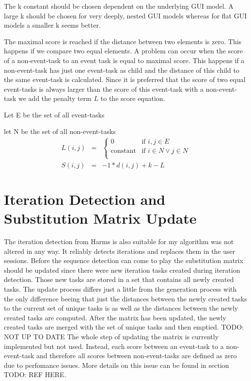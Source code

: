 The k constant should be chosen dependent on the underlying GUI model. A large k should be chosen for very deeply, nested GUI models whereas for flat GUI models a smaller k seems better. 

The maximal score is reached if the distance between two elements is zero. This happens if we compare two equal elements.
A problem can occur when the score of a non-event-task to an event task is equal to maximal score. 
This happens if a non-event-task has just one event-task as child and the distance of this child to the same event-task is calculated. 
Since it is preferred that the score of two equal event-tasks is always larger than the score of this event-task with a non-event-task we add the penalty term $L$ to the score equation.

\begin{definition}
	\item Let E be the set of all event-tasks
	\item let N be the set of all non-event-tasks
\begin{eqnarray*}
	L(i,j) &=& 
	\begin{cases}
		0 & \text{if } i,j \in E \\
		\text{constant} & \text{if } i \in N \lor  j \in N\\
	\end{cases} \\
	S(i,j) &=& -1*d(i,j)+k-L
\end{eqnarray*}
	\label{eq:subscore_adjusted}
\end{definition}


\section{Iteration Detection and Substitution Matrix Update}
The iteration detection from Harms is also suitable for my algorithm was not altered in any way. It reliably detects iterations and replaces them in the user sessions.
Before the sequence detection can come to play the substitution matrix should be updated since there were new iteration tasks created during iteration detection. Those new tasks are stored in a set that contains all newly created tasks.
The update process differs just a little from the generation process with the only difference beeing that just the distances between the newly created tasks to the current set of unique tasks is as well as the distances between the newly created tasks are computed.
After the matrix has been updated, the newly created tasks are merged with the set of unique tasks and then emptied.
TODO: NOT UP TO DATE The whole step of updating the matrix is currently implemented but not used. 
Instead, each score between an event-task to a non-event-task and therefore all scores between non-event-tasks are defined as zero due to perfomance issues.
More details on this issue can be found in section TODO: REF HERE.

